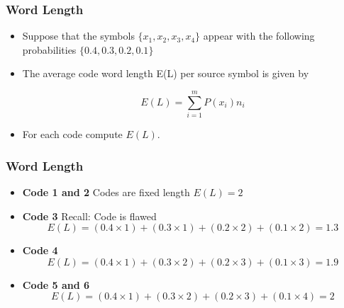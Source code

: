 \begin{frame}
\frametitle{Word Length}
\begin{itemize}
\item Suppose that the symbols $\{x_1, x_2, x_3, x_4\}$ appear with the following probabilities $\{0.4, 0.3, 0.2, 0.1\}$
\item The average code word length E(L) per source symbol is given by

\[ E(L) = \sum ^{m}_{i=1} P(x_i) n_i \]
\item For each code compute $E(L)$.
\end{itemize}
\end{frame}

\begin{frame}
\frametitle{Word Length}
\begin{itemize}
\item \textbf{Code 1 and 2} Codes are fixed length $ E(L) = 2 $
\item \textbf{Code 3} Recall: Code is flawed \[ E(L) = (0.4 \times 1)+(0.3 \times 1)+(0.2 \times 2)+(0.1 \times 2) = 1.3 \]
\item \textbf{Code 4 } \[ E(L) = (0.4 \times 1)+(0.3 \times 2)+(0.2 \times 3)+(0.1 \times 3) = 1.9 \]
\item \textbf{Code 5 and 6} \[ E(L) = (0.4 \times 1)+(0.3 \times 2)+(0.2 \times 3)+(0.1 \times 4) = 2 \]
\end{itemize}
\end{frame}

